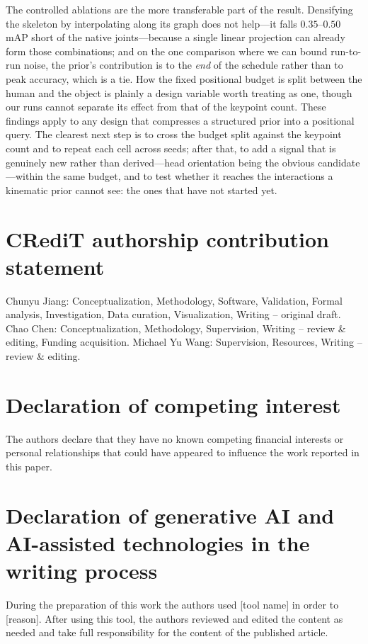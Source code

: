 \documentclass[12pt,a4paper]{article}
\begin{document}
The controlled ablations are the more transferable part of the result.
Densifying the skeleton by interpolating along its graph does not help---it
falls $0.35$--$0.50$ mAP short of the native joints---because a single linear
projection can already form those combinations; and on the one comparison where
we can bound run-to-run noise, the prior's contribution is to the
\emph{end} of the schedule rather than to peak accuracy, which is a tie. How the
fixed positional budget is split between the human and the object is plainly a
design variable worth treating as one, though our runs cannot separate its
effect from that of the keypoint count. These findings apply to any design that
compresses a structured prior into a positional query. The clearest next step is
to cross the budget split against the keypoint count and to repeat each cell
across seeds; after that, to add a signal that is genuinely new rather than
derived---head orientation
being the obvious candidate---within the same budget, and to test whether it
reaches the interactions a kinematic prior cannot see: the ones that have not
started yet.

\section*{CRediT authorship contribution statement}
\noindent Chunyu Jiang: Conceptualization, Methodology, Software, Validation,
Formal analysis, Investigation, Data curation, Visualization, Writing --
original draft. Chao Chen: Conceptualization, Methodology, Supervision,
Writing -- review \& editing, Funding acquisition. Michael Yu Wang:
Supervision, Resources, Writing -- review \& editing.

\section*{Declaration of competing interest}
\noindent The authors declare that they have no known competing financial
interests or personal relationships that could have appeared to influence the
work reported in this paper.

\section*{Declaration of generative AI and AI-assisted technologies in the writing process}
\noindent During the preparation of this work the authors used [tool name] in
order to [reason]. After using this tool, the authors reviewed and edited the
content as needed and take full responsibility for the content of the
published article.
\end{document}
